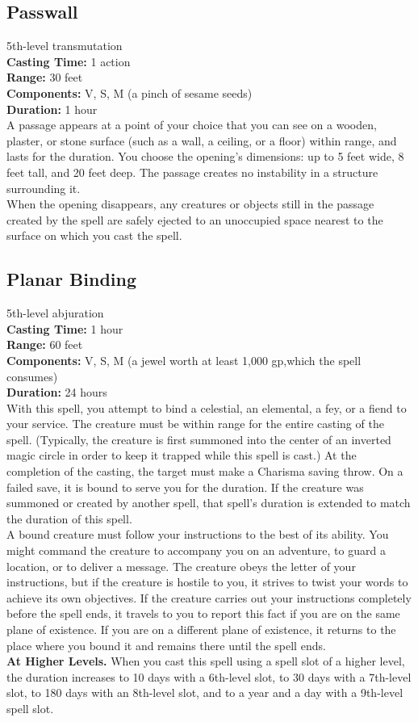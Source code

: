 \documentclass[11pt, A4paper, english]{article}
\begin{document}
		\subsection{Passwall}
5th-level transmutation \\
\textbf{Casting Time:} 1 action \\
\textbf{Range:} 30 feet \\
\textbf{Components:} V, S, M (a pinch of sesame seeds) \\
\textbf{Duration:} 1 hour \\
A passage appears at a point of your choice that you can see on a wooden, plaster, or stone surface (such as a wall, a ceiling, or a floor) within range, and lasts for the duration. You choose the opening’s dimensions: up to 5 feet wide, 8 feet tall, and 20 feet deep. The passage creates no instability in a structure surrounding it. \\
When the opening disappears, any creatures or objects still in the passage created by the spell are safely ejected to an unoccupied space nearest to the surface on which you cast the spell.

		\subsection{Planar Binding}
5th-level abjuration \\
\textbf{Casting Time:} 1 hour \\
\textbf{Range:} 60 feet \\
\textbf{Components:} V, S, M (a jewel worth at least  1,000 gp,which the spell consumes) \\
\textbf{Duration:} 24 hours \\
With this spell, you attempt to bind a celestial, an elemental, a fey, or a fiend to your service. The creature must be within range for the entire casting of the spell. (Typically, the creature is first summoned into the center of an inverted magic circle in order to keep it trapped while this spell is cast.) At the completion of the casting, the target must make a Charisma saving throw. On a failed save, it is bound to serve you for the duration. If the creature was summoned or created by another spell, that spell’s duration is extended to match the duration of this spell. \\
A bound creature must follow your instructions to the best of its ability. You might command the creature to accompany you on an adventure, to guard a location, or to deliver a message. The creature obeys the letter of your instructions, but if the creature is hostile to you, it strives to twist your words to achieve its own objectives. If the creature carries out your instructions completely before the spell ends, it travels to you to report this fact if you are on the same plane of existence. If you are on a different plane of existence, it returns to the place where you bound it and remains there until the spell ends. \\
\textbf{At Higher Levels.} When you cast this spell using a spell slot of a higher level, the duration increases to 10 days with a 6th-level slot, to 30 days with a 7th-level slot, to 180 days with an 8th-level slot, and to a year and a day with a 9th-level spell slot.
\end{document}
